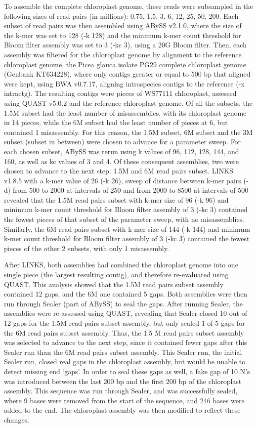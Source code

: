 \documentclass[titlepage,11pt, oneside]{article}   	%
\begin{document}
To assemble the complete chloroplast genome, these reads were subsampled in the following sizes of read pairs (in millions): 0.75, 1.5, 3, 6, 12, 25, 50, 200. Each subset of read pairs was then assembled using ABySS v2.1.0, where the size of the k-mer was set to 128 (-k 128) and the minimum k-mer count threshold for Bloom filter assembly was set to 3 (-kc 3), using a 20G Bloom filter. Then, each assembly was filtered for the chloroplast genome by alignment to the reference chloroplast genome, the Picea glauca isolate PG29 complete chloroplast genome (Genbank KT634228), where only contigs greater or equal to 500 bp that aligned were kept, using BWA v0.7.17, aligning intraspecies contigs to the reference (-x intractg). The resulting contigs were pieces of WS77111 chloroplast, assessed using QUAST v5.0.2 and the reference chloroplast genome. Of all the subsets, the 1.5M subset had the least number of misassemblies, with its chloroplast genome in 14 pieces, while the 6M subset had the least number of pieces at 6, but contained 1 misassembly. For this reason, the 1.5M subset, 6M subset and the 3M subset (subset in between) were chosen to advance for a parameter sweep. For each chosen subset, ABySS was rerun using k values of 96, 112, 128, 144, and 160, as well as kc values of 3 and 4. Of these consequent assemblies, two were chosen to advance to the next step: 1.5M and 6M read pairs subset. LINKS v1.8.5 with a k-mer value of 26 (-k 26), sweep of distance between k-mer pairs (-d) from 500 to 2000 at intervals of 250 and from 2000 to 8500 at intervals of 500 revealed that the 1.5M read pairs subset with k-mer size of 96 (-k 96) and minimum k-mer count threshold for Bloom filter assembly of 3 (-kc 3) contained the fewest pieces of that subset of the parameter sweep, with no misassemblies. Similarly, the 6M read pairs subset with k-mer size of 144 (-k 144) and minimum k-mer count threshold for Bloom filter assembly of 3 (-kc 3) contained the fewest pieces of the other 2 subsets, with only 1 misassembly. 

After LINKS, both assemblies had combined the chloroplast genome into one single piece (the largest resulting contig), and therefore re-evaluated using QUAST. This analysis showed that the 1.5M read pairs subset assembly contained 12 gaps, and the 6M one contained 5 gaps. Both assemblies were then run through Sealer (part of ABySS) to seal the gaps. After running Sealer, the assemblies were re-assessed using QUAST, revealing that Sealer closed 10 out of 12 gaps for the 1.5M read pairs subset assembly, but only sealed 1 of 5 gaps for the 6M read pairs subset assembly. Thus, the 1.5 M read pairs subset assembly was selected to advance to the next step, since it contained fewer gaps after this Sealer run than the 6M read pairs subset assembly. This Sealer run, the initial Sealer run, closed real gaps in the chloroplast assembly, but would be unable to detect missing end ‘gaps’. In order to seal these gaps as well, a fake gap of 10 N’s was introduced between the last 200 bp and the first 200 bp of the chloroplast assembly. This sequence was run through Sealer, and was successfully sealed, where 9 bases were removed from the start of the sequence, and 246 bases were added to the end. The chloroplast assembly was then modified to reflect these changes.
\end{document}
